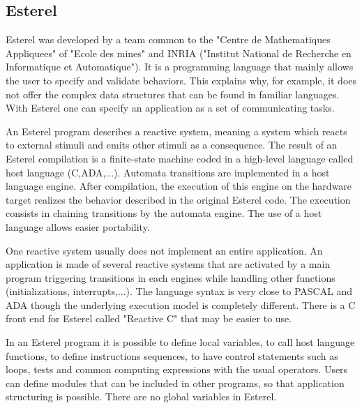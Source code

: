 \documentclass[10pt]{report}
\begin{document}
\subsection{Esterel}

Esterel was developed by a team common to the "Centre de Mathematiques Appliquees" of "Ecole des mines" and INRIA ("Institut
National de Recherche en Informatique et Automatique"). It is a programming language that mainly allows the user to specify 
and validate behaviors. This explains why, for example, it does not offer the complex data structures that can be found in familiar languages. 
With Esterel one can specify an application as a set of communicating tasks.

An Esterel program describes a reactive system, meaning a system which reacts to external stimuli and emits other
stimuli as a consequence. The result of an Esterel compilation is a finite-state machine coded in a high-level language called host language (C,ADA,...).
Automata transitions are implemented in a host language engine. After compilation, the execution of this engine on the hardware target
realizes the behavior described in the original Esterel code. The execution consists in chaining transitions by the automata engine.
The use of a host language allows easier portability.

One reactive system usually does not implement an entire application. An application is made of several reactive systems that are
activated by a main program triggering transitions in each engines while handling other functions (initializations, interrupts,...).
The language syntax is very close to PASCAL and ADA though the underlying execution model is completely different. There is
a C front end for Esterel called "Reactive C" that may be easier to use.

In an Esterel program it is possible to define local variables, to call host language functions, to define instructions sequences,
to have control statements such as loops, tests and common computing expressions with the usual operators. Users can define modules
that can be included in other programs, so that application structuring is possible. There are no global variables in Esterel.
\end{document}
